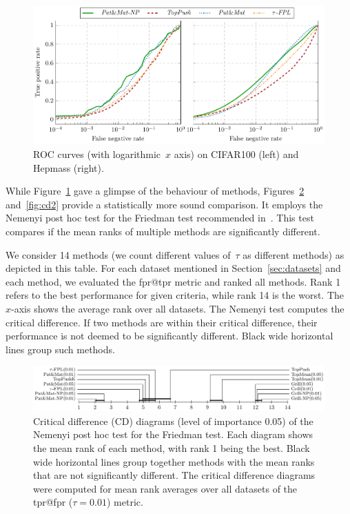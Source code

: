 \begin{figure}[!ht]
  \centering
  \includegraphics[width = \linewidth]{images/primal_results.pdf}
  \caption{ROC curves (with logarithmic~$x$ axis) on CIFAR100 (left) and Hepmass (right).}
  \label{fig:ptau}
\end{figure}

While Figure~\ref{fig:ptau} gave a glimpse of the behaviour of methods, Figures~\ref{fig:cd1} and~\ref{fig:cd2} provide a statistically more sound comparison. It employs the Nemenyi post hoc test for the Friedman test recommended in~\cite{demvsar2006statistical}. This test compares if the mean ranks of multiple methods are significantly different.

We consider 14 methods (we count different values of~$\tau$ as different methods) as depicted in this table. For each dataset mentioned in Section~\ref{sec:datasets} and each method, we evaluated the fpr@tpr metric and ranked all methods. Rank 1 refers to the best performance for given criteria, while rank 14 is the worst. The~$x$-axis shows the average rank over all datasets. The Nemenyi test computes the critical difference. If two methods are within their critical difference, their performance is not deemed to be significantly different. Black wide horizontal lines group such methods.

\begin{figure}[!ht]
  \centering
  \includegraphics[width = \linewidth]{images/crit_diag_fpr_1.pdf}
  \caption{Critical difference (CD) diagrams (level of importance 0.05) of the Nemenyi post hoc test for the Friedman test. Each diagram shows the mean rank of each method, with rank 1 being the best. Black wide horizontal lines group together methods with the mean ranks that are not significantly different. The critical difference diagrams were computed for mean rank averages over all datasets of the tpr@fpr ($\tau=0.01$) metric.}
  \label{fig:cd1}
\end{figure}

